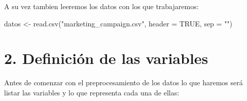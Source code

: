 \documentclass[
]{article}
\newenvironment{Shaded}{\begin{snugshade}}{\end{snugshade}}
\newcommand{\AttributeTok}[1]{\textcolor[rgb]{0.77,0.63,0.00}{#1}}
\newcommand{\ConstantTok}[1]{\textcolor[rgb]{0.00,0.00,0.00}{#1}}
\newcommand{\FunctionTok}[1]{\textcolor[rgb]{0.00,0.00,0.00}{#1}}
\newcommand{\NormalTok}[1]{#1}
\newcommand{\OtherTok}[1]{\textcolor[rgb]{0.56,0.35,0.01}{#1}}
\newcommand{\StringTok}[1]{\textcolor[rgb]{0.31,0.60,0.02}{#1}}
\begin{document}
A su vez tambien leeremos los datos con los que trabajaremos:

\begin{Shaded}
\begin{Highlighting}[]
\NormalTok{datos }\OtherTok{\textless{}{-}} \FunctionTok{read.csv}\NormalTok{(}\StringTok{"marketing\_campaign.csv"}\NormalTok{, }\AttributeTok{header =} \ConstantTok{TRUE}\NormalTok{, }\AttributeTok{sep =} \StringTok{""}\NormalTok{)}
\end{Highlighting}
\end{Shaded}

\newpage

\hypertarget{definiciuxf3n-de-las-variables}{%
\section{2. Definición de las
variables}\label{definiciuxf3n-de-las-variables}}

Antes de comenzar con el preprocesamiento de los datos lo que haremos
será listar las variables y lo que representa cada una de ellas:
\end{document}

